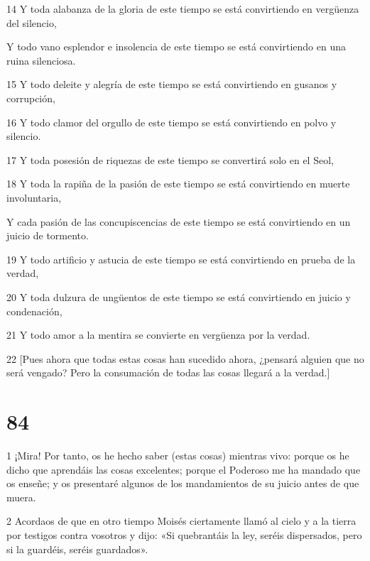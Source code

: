 \par 14 Y toda alabanza de la gloria de este tiempo se está convirtiendo en vergüenza del silencio,

\par Y todo vano esplendor e insolencia de este tiempo se está convirtiendo en una ruina silenciosa.

\par 15 Y todo deleite y alegría de este tiempo se está convirtiendo en gusanos y corrupción,

\par 16 Y todo clamor del orgullo de este tiempo se está convirtiendo en polvo y silencio.

\par 17 Y toda posesión de riquezas de este tiempo se convertirá solo en el Seol,

\par 18 Y toda la rapiña de la pasión de este tiempo se está convirtiendo en muerte involuntaria,

\par Y cada pasión de las concupiscencias de este tiempo se está convirtiendo en un juicio de tormento.

\par 19 Y todo artificio y astucia de este tiempo se está convirtiendo en prueba de la verdad,

\par 20 Y toda dulzura de ungüentos de este tiempo se está convirtiendo en juicio y condenación,

\par 21 Y todo amor a la mentira se convierte en vergüenza por la verdad.

\par 22 [Pues ahora que todas estas cosas han sucedido ahora, ¿pensará alguien que no será vengado? Pero la consumación de todas las cosas llegará a la verdad.]

\chapter{84}

\par 1 ¡Mira! Por tanto, os he hecho saber (estas cosas) mientras vivo: porque os he dicho que aprendáis las cosas excelentes; porque el Poderoso me ha mandado que os enseñe; y os presentaré algunos de los mandamientos de su juicio antes de que muera.

\par 2 Acordaos de que en otro tiempo Moisés ciertamente llamó al cielo y a la tierra por testigos contra vosotros y dijo: «Si quebrantáis la ley, seréis dispersados, pero si la guardéis, seréis guardados».


